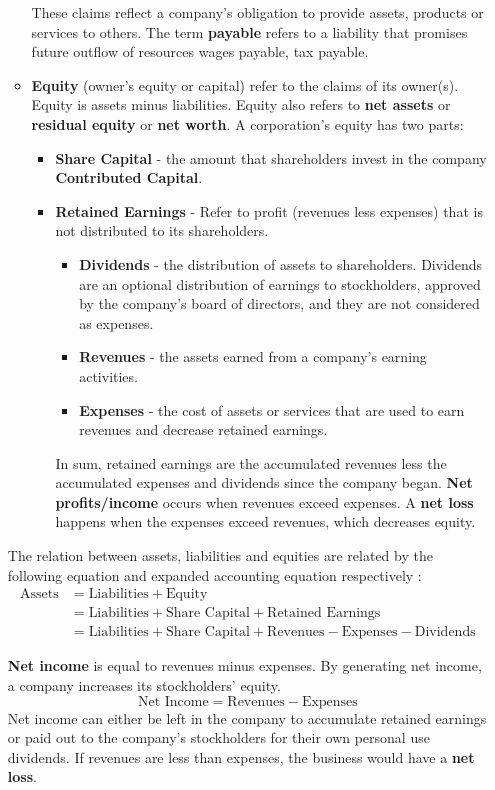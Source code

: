 \documentclass[../main.tex]{subfiles}
\begin{document}
\begin{itemize}[noitemsep]
\begin{itemize}[noitemsep]
			These claims reflect a company's obligation to provide assets, 
			products or services to others. The term \textbf{payable} refers to 
			a liability that promises future outflow of resources \eg wages 
			payable, tax payable.
			\item \textbf{Equity} (owner's equity or capital) refer to the 
			claims of its owner(s). Equity is assets minus liabilities. Equity 
			also refers to \textbf{net assets} or \textbf{residual equity} or 
			\textbf{net worth}. A corporation's equity has two parts: 
			\begin{itemize}[noitemsep]
				\item \textbf{Share Capital} - the amount that 
				shareholders invest in the company \ie \textbf{Contributed 
				Capital}. 
				\item \textbf{Retained Earnings} - Refer to profit (revenues 
				less expenses) that is not distributed to its shareholders. 
				\begin{itemize}[noitemsep]
					\item \textbf{Dividends} - the distribution of assets to 
					shareholders. Dividends are an optional distribution of 
					earnings to stockholders, approved by the company's board 
					of directors, and they are not considered as expenses. 
					\item \textbf{Revenues} - the assets earned from a 
					company's earning activities.
					\item \textbf{Expenses} - the cost of assets or 
					services that are used to earn revenues and decrease 
					retained earnings.
				\end{itemize} 
		 		In sum, retained earnings are the accumulated 
				revenues less the accumulated expenses and dividends since the 
				company began. \textbf{Net profits/income} occurs when revenues 
				exceed expenses. A \textbf{net loss} happens when the expenses 
				exceed revenues, which decreases equity. 
			\end{itemize}
		\end{itemize}
		
		The relation between assets, liabilities and equities are related by 
		the following equation and expanded accounting equation respectively 
		\ie:
		\begin{align*}
		\text{Assets} &= \text{Liabilities} + \text{Equity} \\
		&= \text{Liabilities} + \text{Share Capital} + \text{Retained 
		Earnings}\\
		&= \text{Liabilities} + \text{Share Capital} + \text{Revenues} - 
		\text{Expenses} - \text{Dividends}
		\end{align*}
		
		\textbf{Net income} is equal to revenues minus expenses. By generating 
		net income, a company increases its stockholders’ equity.
		\[
		\text{Net Income} = \text{Revenues} - \text{Expenses}
		\]
		 Net income 
		can either be left in the company to accumulate \ie retained earnings
		or paid out to the company’s stockholders for their own personal use 
		\ie dividends. If revenues are less than expenses, the business would 
		have a \textbf{net loss}.
	\end{itemize}
	
\end{document}
